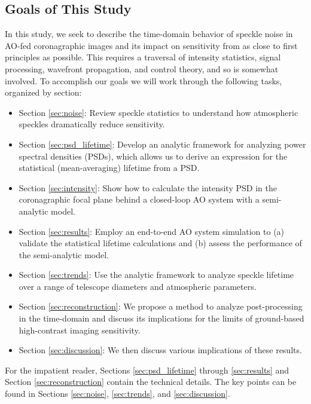 \documentclass[10pt,preprint]{aastex631}
\begin{document}
\subsection{Goals of This Study}
In this study, we seek to describe the time-domain behavior of speckle noise in AO-fed coronagraphic images and its impact on sensitivity from as close to first principles as possible.  This requires a traversal of intensity statistics, signal processing, wavefront propagation, and control theory, and so is somewhat involved. To accomplish our goals we will work through the following tasks, organized by section:
\begin{itemize}
\item Section \ref{sec:noise}: Review speckle statistics to understand how atmospheric speckles dramatically reduce sensitivity. \\
\item Section \ref{sec:psd_lifetime}: Develop an analytic framework for analyzing power spectral densities (PSDs), which allows us to derive an expression for the statistical (mean-averaging) lifetime from a PSD.
\item Section \ref{sec:intensity}: Show how to calculate the intensity PSD in the coronagraphic focal plane behind a closed-loop AO system with a semi-analytic model.
\item Section \ref{sec:results}: Employ an end-to-end AO system simulation to (a) validate the statistical lifetime calculations and (b) assess the performance of the semi-analytic model.
\item Section \ref{sec:trends}: Use the analytic framework to analyze speckle lifetime over a range of telescope diameters and atmospheric parameters.
\item Section \ref{sec:reconstruction}: We propose a method to analyze post-processing in the time-domain and discuss its implications for the limits of ground-based high-contrast imaging sensitivity.
\item Section \ref{sec:discussion}: We then discuss various implications of these results.
\end{itemize}
For the impatient reader, Sections \ref{sec:psd_lifetime} through \ref{sec:results} and Section \ref{sec:reconstruction} contain the technical details.  The key points can be found in Sections \ref{sec:noise}, \ref{sec:trends}, and \ref{sec:discussion}.
\end{document}
